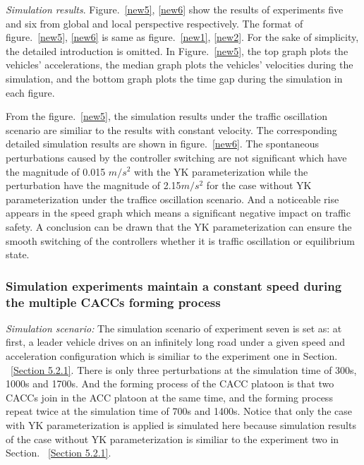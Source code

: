 \documentclass[a4paper,fleqn]{cas-sc}
\begin{document}
\textit{Simulation results}. Figure.~\ref{new5}, \ref{new6} show the results of experiments five and six from global and local perspective respectively. The format of figure.~\ref{new5}, \ref{new6} is same as figure.~\ref{new1}, \ref{new2}. For the sake of simplicity, the detailed introduction is omitted. In Figure.~\ref{new5}, the top graph plots the vehicles' accelerations, the median graph plots the vehicles' velocities during the simulation, and the bottom graph plots the time gap during the simulation in each figure.

From the figure.~\ref{new5}, the simulation results under the traffic oscillation scenario are similiar to the results with constant velocity. The corresponding detailed simulation results are shown in figure.~\ref{new6}. The spontaneous perturbations caused by the controller switching are not significant which have the magnitude of 0.015 $m/s^2$ with the YK parameterization while the perturbation have the magnitude of 2.15$m/s^2$ for the case without YK parameterization under the traffice oscillation scenario. And a noticeable rise appears in the speed graph which means a significant negative impact on traffic safety. A conclusion can be drawn that the YK parameterization can ensure the smooth switching of the controllers whether it is traffic oscillation or equilibrium state.

\subsubsection{Simulation experiments maintain a constant speed during the multiple CACCs forming process}
\label{Section 5.2.3}

\textit{Simulation scenario:} The simulation scenario of experiment seven is set as: at first, a leader vehicle drives on an infinitely long road under a given speed and acceleration configuration which is similiar to the experiment one in Section. ~\ref{Section 5.2.1}. There is only three perturbations at the simulation time of 300s, 1000s and 1700s. And the forming process of the CACC platoon is that two CACCs join in the ACC platoon at the same time, and the forming process repeat twice at the simulation time of 700s and 1400s. Notice that only the case with YK parameterization is applied is simulated here because simulation results of the case without YK parameterization is similiar to the experiment two in Section. ~\ref{Section 5.2.1}.
\end{document}
